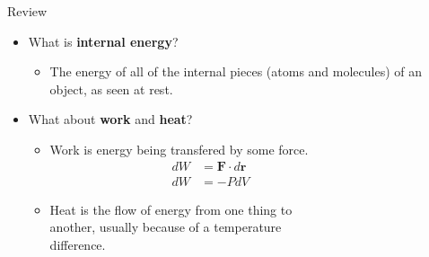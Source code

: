 \documentclass{beamer}
\begin{document}
\begin{frame}[t]{Review}
\begin{itemize}
   \item<1-> What is {\bf internal energy}?
   \begin{itemize}
      \item<2-> The energy of all of the internal pieces (atoms and molecules) of an object, as seen at rest.
   \end{itemize}
   \item<3-> What about {\bf work} and {\bf heat}?
   \begin{itemize}
      \item<4-> Work is energy being transfered by some force.
      \begin{align*}
         dW&=\mathbf{F}\cdot d\mathbf{r}~~~~~~~~~~~~~~~~~~~~~~~~~~~~~~~~\\
         dW&=-PdV~~~~~~~~~~~~~~~~~~~~~~~~~~~~~~~~
      \end{align*}
      \vspace{-0.8cm}
      \item<5-> Heat is the flow of energy from one thing to \\ another, usually because of a temperature \\ difference.
   \end{itemize}
\end{itemize}
\end{frame}
\end{document}
